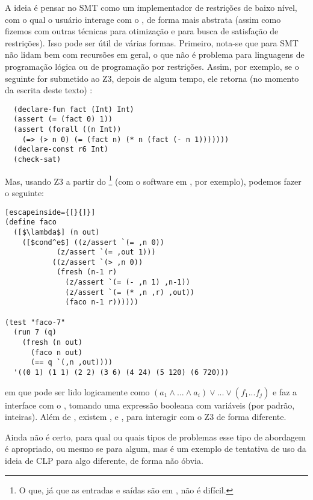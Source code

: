 \documentclass{article}
\begin{document}
A ideia é pensar no  SMT como um implementador de
restrições de baixo nível, com o qual o usuário interage com o
, de forma mais abstrata (assim como fizemos com outras
técnicas para otimização e para busca de satisfação de
restrições). Isso pode ser útil de várias formas. Primeiro, nota-se
que  para SMT não lidam bem com recursões em geral, o que
não é problema para linguagens de programação lógica ou de programação
por restrições. Assim, por exemplo, se o seguinte for submetido ao Z3,
depois de algum tempo, ele retorna (no momento da escrita deste texto)
:

\begin{lstlisting}
  (declare-fun fact (Int) Int)
  (assert (= (fact 0) 1))
  (assert (forall ((n Int))
    (=> (> n 0) (= (fact n) (* n (fact (- n 1)))))))
  (declare-const r6 Int)
  (check-sat)
\end{lstlisting}

Mas, usando Z3 a partir do \footnote{O que, já que as
  entradas e saídas são em , não é difícil.} (com o
software em \cite{namin}, por exemplo), podemos fazer o seguinte:\\

\begin{lstlisting}[escapeinside={[}{]}]
(define faco
  ([$\lambda$] (n out)
    ([$cond^e$] ((z/assert `(= ,n 0))
            (z/assert `(= ,out 1)))
           ((z/assert `(> ,n 0))
            (fresh (n-1 r)
              (z/assert `(= (- ,n 1) ,n-1))
              (z/assert `(= (* ,n ,r) ,out))
              (faco n-1 r))))))

(test "faco-7"
  (run 7 (q)
    (fresh (n out)
      (faco n out)
      (== q `(,n ,out))))
  '((0 1) (1 1) (2 2) (3 6) (4 24) (5 120) (6 720)))

\end{lstlisting}

\noindent em que  pode ser lido logicamente como $(a_1 \wedge ... \wedge a_i) \vee
... \vee (f_1 ... f_j)$ e  faz a interface com o
, tomando uma expressão booleana com variáveis (por
padrão, inteiras). Além de , existem ,
 e , para interagir com o Z3 de forma
diferente.

Ainda não é certo, para qual ou quais tipos de problemas esse tipo de
abordagem é apropriado, ou mesmo se para algum, mas é um exemplo de
tentativa de uso da ideia de CLP para algo diferente, de forma não
óbvia.
           
\end{document}
